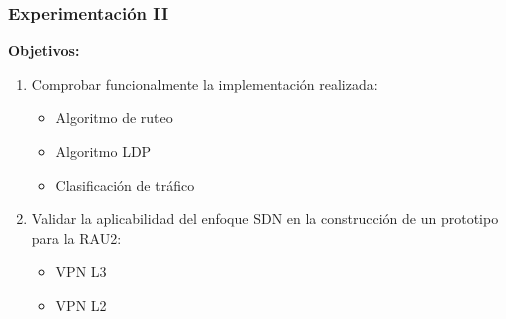 \documentclass{beamer}
\begin{document}
%
%
%
%
%
%

\begin{frame}
\frametitle{Experimentaci\'on II} 

\textbf{Objetivos:}
\begin{enumerate}
\item Comprobar funcionalmente la implementaci\'on realizada:
\begin{itemize}
\item Algoritmo de ruteo
\item Algoritmo LDP
\item Clasificaci\'on de tr\'afico
\end{itemize}
\item Validar la aplicabilidad del enfoque SDN en la construcci\'on de un prototipo para la RAU2:
\begin{itemize}
\item VPN L3
\item VPN L2
\end{itemize}
\end{enumerate}
\end{frame}
\end{document}

